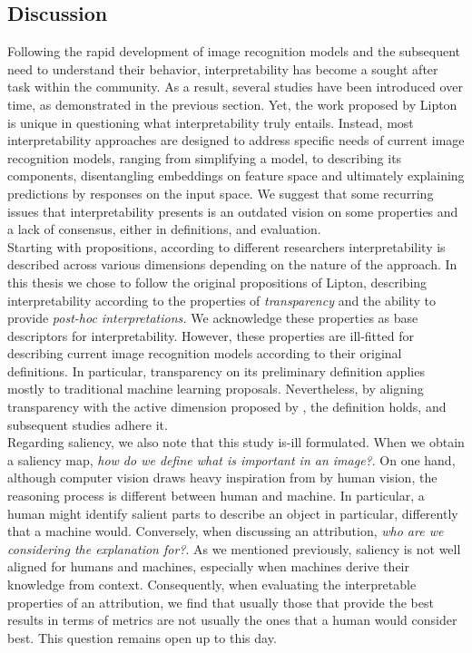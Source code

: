 \subsection{Discussion}
\label{sec:rel_interp_discussion}
Following the rapid development of image recognition models and the subsequent need to understand 
their behavior, interpretability has become a sought after task within the community. As a result, 
several studies have been introduced over time, as demonstrated in the previous section. Yet, the 
work proposed by Lipton is unique in questioning what interpretability truly entails. 
Instead, most interpretability approaches are designed to address specific needs of current image 
recognition models, ranging from simplifying a model, to describing its components, disentangling 
embeddings on feature space and ultimately explaining predictions by responses on the input space. 
We suggest that some recurring issues that interpretability presents is an outdated vision on some 
properties and a lack of consensus, either in definitions, and evaluation.\\

\noindent Starting with propositions, according to different researchers interpretability is 
described across various dimensions depending on the nature of the approach. In this thesis we 
chose to follow the original propositions of Lipton, describing interpretability according to the 
properties of \emph{transparency} and the ability to provide \emph{post-hoc interpretations.} We 
acknowledge these properties as base descriptors for interpretability. However, these 
properties are ill-fitted for describing current image recognition models according 
to their original definitions. In particular, transparency on its preliminary definition applies 
mostly to traditional machine learning proposals. Nevertheless, by aligning transparency with 
the active dimension proposed by \cite{zhang2021survey}, the definition holds, and subsequent 
studies adhere it.\\

\noindent Regarding saliency, we also note that this study is-ill formulated. When we obtain a 
saliency map, \emph{how do we define what is important in an image?}. On one hand, although computer  
vision draws heavy inspiration from by human vision, the reasoning process is different between 
human and machine. In particular, a human might identify salient parts to describe an object in 
particular, differently that a machine would. Conversely, when discussing an attribution, 
\emph{who are we considering the explanation for?}. As we mentioned previously, saliency is not 
well aligned for humans and machines, especially when machines derive their knowledge from context. 
Consequently, when evaluating the interpretable properties of an attribution, we find that usually 
those that provide the best results in terms of metrics are not usually the ones that a human 
would consider best. This question remains open up to this day.\\

